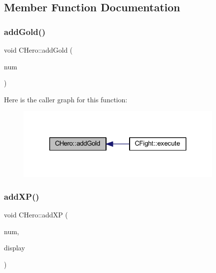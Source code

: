 \subsection{Member Function Documentation}
\mbox{\label{class_c_hero_aa906388b12b8194cf4bfc45a42027322}} 
\subsubsection{\texorpdfstring{add\+Gold()}{addGold()}}
{\footnotesize\ttfamily void C\+Hero\+::add\+Gold (\begin{DoxyParamCaption}\item[{int}]{num }\end{DoxyParamCaption})\hspace{0.3cm}{\ttfamily [inline]}}

Here is the caller graph for this function\+:\nopagebreak
\begin{figure}[H]
\begin{center}
\leavevmode
\includegraphics[width=288pt]{class_c_hero_aa906388b12b8194cf4bfc45a42027322_icgraph}
\end{center}
\end{figure}
\mbox{\label{class_c_hero_aa184a6841da51966480c2172c2f80134}} 
\subsubsection{\texorpdfstring{add\+X\+P()}{addXP()}}
{\footnotesize\ttfamily void C\+Hero\+::add\+XP (\begin{DoxyParamCaption}\item[{int}]{num,  }\item[{const \mbox{\hyperlink{class_c_display}{C\+Display}} \&}]{display }\end{DoxyParamCaption})}

